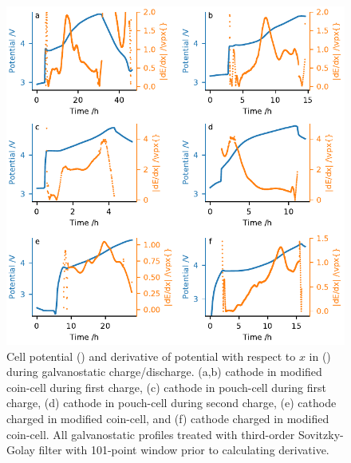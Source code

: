 \documentclass{article}
\begin{document}
\begin{figure}
  \includegraphics{figures/echem-derivatives.pdf}
  \caption{Cell potential (\textcolor{C0}{\mplline{}}) and derivative
    of potential with respect to $x$ in 
    (\textcolor{C1}{\mpldots}) during galvanostatic
    charge/discharge. (a,b) \nmc[333]{} cathode in modified coin-cell
    during first charge, (c) \nca{} cathode in pouch-cell during first
    charge, (d) \nca{} cathode in pouch-cell during second charge, (e)
    \nca{} cathode charged in modified coin-cell, and (f) \nmc[532]{}
    cathode charged in modified coin-cell. All galvanostatic profiles
    treated with third-order Sovitzky-Golay filter with 101-point
    window prior to calculating derivative.}
  \label{fig:echem-derivatives}
\end{figure}

\end{document}
